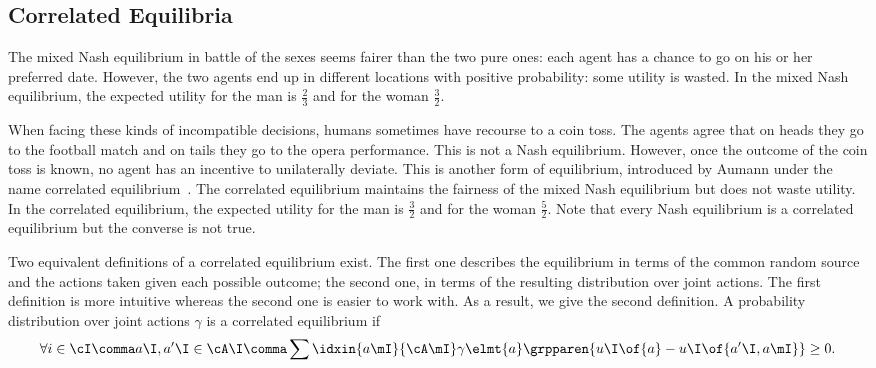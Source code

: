 \subsection{Correlated Equilibria}
\label{sec:correlated_equilibria}
The mixed Nash equilibrium in battle of the sexes seems fairer than the two pure ones: each agent has a chance to go on his or her preferred date.
However, the two agents end up in different locations with positive probability: some utility is wasted.
In the mixed Nash equilibrium, the expected utility for the man is \(\frac{2}{3}\) and for the woman \(\frac{3}{2}\).

When facing these kinds of incompatible decisions, humans sometimes have recourse to a coin toss.
The agents agree that on heads they go to the football match and on tails they go to the opera performance.
This is not a Nash equilibrium.
However, once the outcome of the coin toss is known, no agent has an incentive to unilaterally deviate.
This is another form of equilibrium, introduced by Aumann under the name correlated equilibrium~\cite{aumann:1987}.
The correlated equilibrium maintains the fairness of the mixed Nash equilibrium but does not waste utility.
In the correlated equilibrium, the expected utility for the man is \(\frac{3}{2}\) and for the woman \(\frac{5}{2}\).
Note that every Nash equilibrium is a correlated equilibrium but the converse is not true.

Two equivalent definitions of a correlated equilibrium exist.
The first one describes the equilibrium in terms of the common random source and the actions taken given each possible outcome; the second one, in terms of the resulting distribution over joint actions.
The first definition is more intuitive whereas the second one is easier to work with.
As a result, we give the second definition.
A probability distribution over joint actions \(\gamma\) is a correlated equilibrium if
\begin{equation}
\label{eq:correlated_equilibrium}
\forall i \in \cI \comma a\I, a'\I \in\cA\I \comma \sum\idxin{a\mI}{\cA\mI} \gamma\elmt{a} \grpparen{u\I \of {a} - u\I \of {a'\I, a\mI}} \geq 0.
\end{equation}
